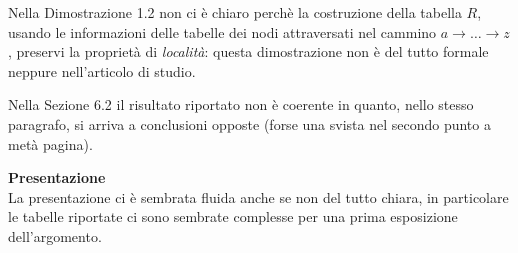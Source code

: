 \documentclass[11pt]{article}
\begin{document}
\begin{formalreport}
  Nella Dimostrazione 1.2 non ci \`e chiaro perch\`e la costruzione
  della tabella $R$, usando le informazioni delle tabelle dei nodi
  attraversati nel cammino $a \rightarrow \ldots \rightarrow z$,
  preservi la propriet\`a di \emph{localit\`a}: questa dimostrazione
  non \`e del tutto formale neppure nell'articolo di studio.

  Nella Sezione 6.2 il risultato riportato non \`e coerente in quanto,
  nello stesso paragrafo, si arriva a conclusioni opposte (forse una
  svista nel secondo punto a met\`a pagina).

  \textbf{Presentazione}\\
  La presentazione ci \`e sembrata fluida anche se non del tutto
  chiara, in particolare le tabelle riportate ci sono sembrate
  complesse per una prima esposizione dell'argomento.
 
\end{formalreport}
\end{document}
